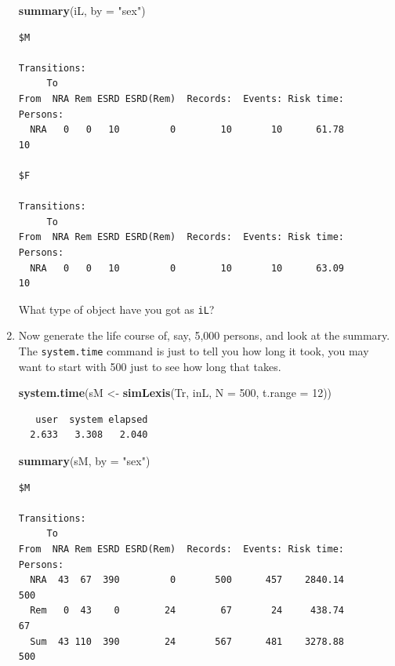 \documentclass[
]{book}
\newenvironment{Shaded}{\begin{snugshade}}{\end{snugshade}}
\newcommand{\AttributeTok}[1]{\textcolor[rgb]{0.13,0.29,0.53}{#1}}
\newcommand{\DecValTok}[1]{\textcolor[rgb]{0.00,0.00,0.81}{#1}}
\newcommand{\FunctionTok}[1]{\textcolor[rgb]{0.13,0.29,0.53}{\textbf{#1}}}
\newcommand{\NormalTok}[1]{#1}
\newcommand{\OtherTok}[1]{\textcolor[rgb]{0.56,0.35,0.01}{#1}}
\newcommand{\StringTok}[1]{\textcolor[rgb]{0.31,0.60,0.02}{#1}}
\begin{document}
\begin{enumerate}
\begin{Shaded}
\begin{Highlighting}[]
\FunctionTok{summary}\NormalTok{(iL, }\AttributeTok{by =} \StringTok{"sex"}\NormalTok{)}
\end{Highlighting}
\end{Shaded}

\begin{verbatim}
$M

Transitions:
     To
From  NRA Rem ESRD ESRD(Rem)  Records:  Events: Risk time:  Persons:
  NRA   0   0   10         0        10       10      61.78        10

$F

Transitions:
     To
From  NRA Rem ESRD ESRD(Rem)  Records:  Events: Risk time:  Persons:
  NRA   0   0   10         0        10       10      63.09        10
\end{verbatim}

  What type of object have you got as \texttt{iL}?
\item
  Now generate the life course of, say, 5,000 persons, and look at the summary.
  The \texttt{system.time} command is just to tell you how long it
  took, you may want to start with 500 just to see how long that takes.

\begin{Shaded}
\begin{Highlighting}[]
\FunctionTok{system.time}\NormalTok{(sM }\OtherTok{\textless{}{-}} \FunctionTok{simLexis}\NormalTok{(Tr, inL, }\AttributeTok{N =} \DecValTok{500}\NormalTok{, }\AttributeTok{t.range =} \DecValTok{12}\NormalTok{))}
\end{Highlighting}
\end{Shaded}

\begin{verbatim}
   user  system elapsed 
  2.633   3.308   2.040 
\end{verbatim}

\begin{Shaded}
\begin{Highlighting}[]
\FunctionTok{summary}\NormalTok{(sM, }\AttributeTok{by =} \StringTok{"sex"}\NormalTok{)}
\end{Highlighting}
\end{Shaded}

\begin{verbatim}
$M

Transitions:
     To
From  NRA Rem ESRD ESRD(Rem)  Records:  Events: Risk time:  Persons:
  NRA  43  67  390         0       500      457    2840.14       500
  Rem   0  43    0        24        67       24     438.74        67
  Sum  43 110  390        24       567      481    3278.88       500


\end{verbatim}
\end{enumerate}
\end{document}
